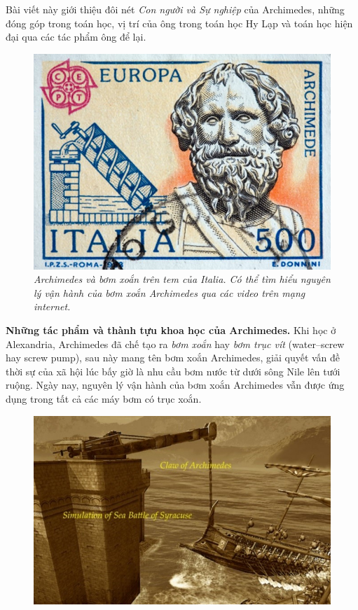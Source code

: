\begin{multicols}{2}
	\vskip 0.1cm
	Bài viết này giới thiệu đôi nét \textit{Con người và Sự nghiệp} của Archimedes, những đóng góp trong toán học, vị trí của ông trong toán học Hy Lạp và toán học hiện đại qua các tác phẩm ông để lại. 
	\begin{figure}[H]
		\vspace*{-5pt}
		\centering
		\captionsetup{labelformat= empty, justification=centering}
		\includegraphics[width= 1\linewidth]{2}
		\caption{\small\textit{\color{lichsutoanhoc}Archimedes và bơm xoắn trên tem của Italia. Có thể tìm hiểu nguyên lý vận hành của bơm xoắn Archimedes qua các video trên mạng internet.}}
		\vspace*{-10pt}
	\end{figure}
	\textbf{\color{lichsutoanhoc}Những tác phẩm và thành tựu khoa học của Archimedes.} Khi học ở Alexandria, Archimedes đã chế tạo ra \textit{bơm xoắn} hay \textit{bơm trục vít} (water--screw hay screw pump), sau này mang tên bơm xoắn Archimedes, giải quyết vấn đề thời sự của xã hội lúc bấy giờ là nhu cầu bơm nước từ dưới sông Nile lên tưới ruộng. Ngày nay, nguyên lý vận hành của bơm xoắn Archimedes vẫn được ứng dụng trong tất cả các máy bơm có trục xoắn. 
	\begin{figure}[H]
		\vspace*{-5pt}
		\centering
		\captionsetup{labelformat= empty, justification=centering}
		\includegraphics[width= 1\linewidth]{3}

\end{figure}
\end{multicols}
